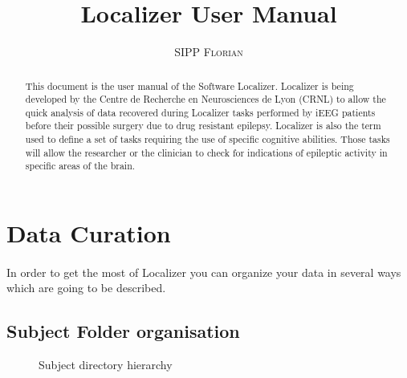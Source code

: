 \documentclass[a4paper]{article}
\title{Localizer User Manual}
\author{\textsc{SIPP Florian}}
\begin{document}
\maketitle
\begin{abstract}
This document is the user manual of the Software Localizer. Localizer is being developed by the Centre de Recherche en Neurosciences de Lyon (CRNL) to allow the quick analysis of data recovered during Localizer tasks performed by iEEG patients before their possible surgery due to drug resistant epilepsy.  Localizer is also the term used to define a set of tasks requiring the use of specific cognitive abilities. Those tasks will allow the researcher or the clinician to check for indications of epileptic activity in specific areas of the brain. 
\end{abstract}
\tableofcontents
\newpage
\section{Data Curation} \label{curation}    
\paragraph{} In order to get the most of Localizer you can organize your data in several ways which are going to be described.
\subsection{Subject Folder organisation} \label{subjectfolderorganisation}   
\begin{figure}[H]
\caption{\label{SubjectDirectory}Subject directory hierarchy}
\end{figure}
\end{document}
